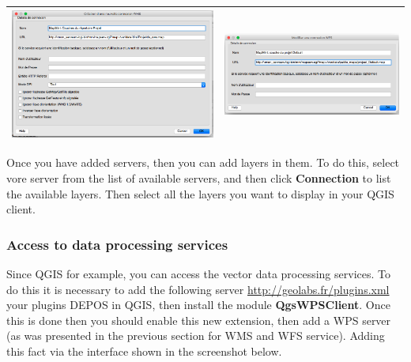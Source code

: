 \documentclass[letterpaper,10pt,english]{sphinxmanual}
\begin{document}
\begin{tabulary}{\linewidth}{|L|L|}
\hline

\includegraphics{qgis-wms.png}
 & 
\includegraphics{qgis-wfs.png}
\\
\hline\end{tabulary}


Once you have added servers, then you can add layers in them. To do this, select vore server from the list of available servers, and then click \textbf{Connection} to list the available layers. Then select all the layers you want to display in your QGIS client.


\subsubsection{Access to data processing services}
\label{introduction/usemapmint:acceder-aux-services-de-traitements-de-donnees}
Since QGIS for example, you can access the vector data processing services. To do this it is necessary to add the following server \href{http://geolabs.fr/plugins.xml}{http://geolabs.fr/plugins.xml} your plugins DEPOS in QGIS, then install the module \textbf{QgsWPSClient}. Once this is done then you should enable this new extension, then add a WPS server (as was presented in the previous section for WMS and WFS service). Adding this fact via the interface shown in the screenshot below.
\end{document}

